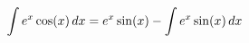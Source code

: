 \documentclass[preview]{standalone}
\begin{document}
\begin{align*}
\special{dvisvgm:raw <g id='unique000'>}\int e^x \cos(x) \, dx = e^x \sin(x) - \int e^x \sin(x) \, dx\special{dvisvgm:raw </g>}
\end{align*}
\end{document}
